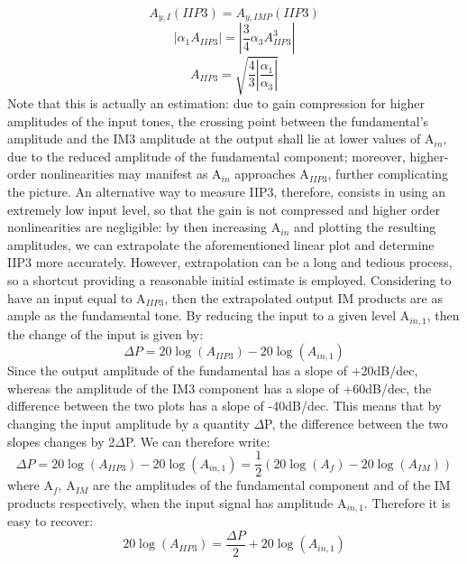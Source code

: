 \begin{equation}
	A_{y,I}(IIP3) = A_{y,IMP}(IIP3)
\end{equation}
\begin{equation}
	|\alpha_1A_{IIP3}| = |\frac{3}{4}\alpha_3A_{IIP3}^3|
\end{equation}
\begin{equation}
	A_{IIP3} = \sqrt{\frac{4}{3}|\frac{\alpha_1}{\alpha_3}|}
\end{equation}
Note that this is actually an estimation: due to gain compression for higher amplitudes of the input tones, the crossing point between the fundamental's amplitude and the IM3 amplitude at the output shall lie at lower values of A$_{in}$, due to the reduced amplitude of the fundamental component; moreover, higher-order nonlinearities may manifest as A$_{in}$ approaches A$_{IIP3}$, further complicating the picture. An alternative way to measure IIP3, therefore, consists in using an extremely low input level, so that the gain is not compressed and higher order nonlinearities are negligible: by then increasing A$_{in}$ and plotting the resulting amplitudes, we can extrapolate the aforementioned linear plot and determine IIP3 more accurately.
However,  extrapolation can be a long and tedious process, so a shortcut providing a reasonable initial estimate is employed. Considering to have an input equal to A$_{IIP3}$, then the extrapolated output IM products are as ample as the fundamental tone. By reducing the input to a given level A$_{in,1}$, then the change of the input is given by: 
\begin{equation}
	\Delta P = 20\log(A_{IIP3}) - 20\log(A_{in,1})
\end{equation}
Since the output amplitude of the fundamental has a slope of +20dB/dec, whereas the amplitude of the IM3 component has a slope of +60dB/dec, the difference between the two plots has a slope of -40dB/dec. This means that by changing the input amplitude by a quantity $\Delta$P, the difference between the two slopes changes by 2$\Delta$P. We can therefore write: 
\begin{equation}
	\Delta P = 20\log(A_{IIP3}) - 20\log(A_{in,1}) = \frac{1}{2}(20\log(A_f) - 20\log(A_{IM}))
\end{equation}
where A$_f$, A$_{IM}$ are the amplitudes of the fundamental component and of the IM products respectively, when the input signal has amplitude A$_{in,1}$. Therefore it is easy to recover: 
\begin{equation}
	20\log(A_{IIP3}) = \frac{\Delta P}{2} + 20\log(A_{in,1})
\end{equation} 

